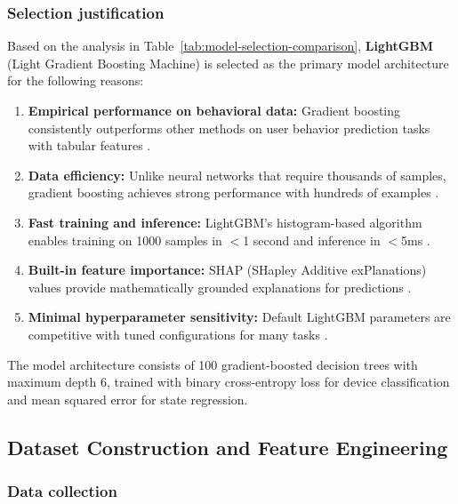\subsubsection{Selection justification}

Based on the analysis in Table~\ref{tab:model-selection-comparison}, \textbf{LightGBM} (Light Gradient Boosting Machine) is selected as the primary model architecture for the following reasons:

\begin{enumerate}
    \item \textbf{Empirical performance on behavioral data:} Gradient boosting consistently outperforms other methods on user behavior prediction tasks with tabular features \cite{guo_entity_2017, xu_behavior_2020}.
    
    \item \textbf{Data efficiency:} Unlike neural networks that require thousands of samples, gradient boosting achieves strong performance with hundreds of examples \cite{shwartz-ziv_tabular_2022}.
    
    \item \textbf{Fast training and inference:} LightGBM's histogram-based algorithm enables training on 1000 samples in $<$1 second and inference in $<$5ms \cite{ke_lightgbm_2017}.
    
    \item \textbf{Built-in feature importance:} SHAP (SHapley Additive exPlanations) values provide mathematically grounded explanations for predictions \cite{lundberg_unified_2017}.
    
    \item \textbf{Minimal hyperparameter sensitivity:} Default LightGBM parameters are competitive with tuned configurations for many tasks \cite{ferreira_hyperparameter_2021}.
\end{enumerate}

The model architecture consists of 100 gradient-boosted decision trees with maximum depth 6, trained with binary cross-entropy loss for device classification and mean squared error for state regression.

\subsection{Dataset Construction and Feature Engineering}
\label{sec:dataset-features}

\subsubsection{Data collection}

